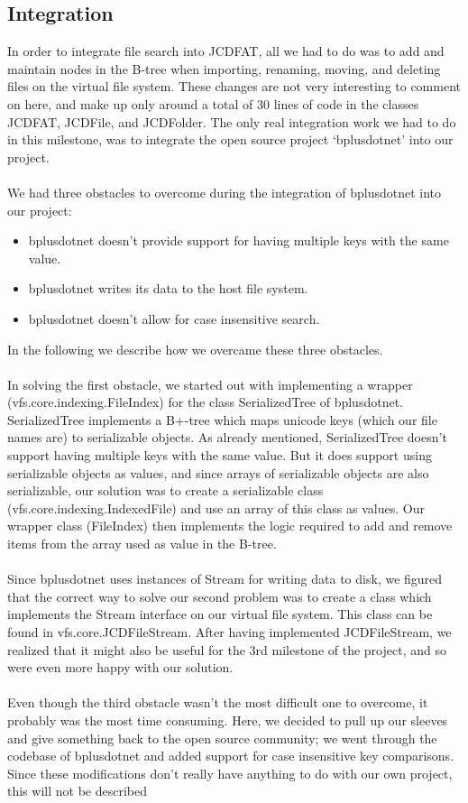 \documentclass[a4paper,12pt]{article}
\begin{document}
\subsection{Integration}
\label{sec:integration}
In order to integrate file search into JCDFAT, all we had to do was to add and maintain nodes in the B-tree when importing, renaming, moving, and deleting files on the virtual file system. These changes are not very interesting to comment on here, and make up only around a total of 30 lines of code in the classes JCDFAT, JCDFile, and JCDFolder. The only real integration work we had to do in this milestone, was to integrate the open source project `bplusdotnet' into our project.\\
\\
We had three obstacles to overcome during the integration of bplusdotnet into our project:
\begin{itemize}
    \item bplusdotnet doesn't provide support for having multiple keys with the same value.
    \item bplusdotnet writes its data to the host file system.
    \item bplusdotnet doesn't allow for case insensitive search.
\end{itemize}
In the following we describe how we overcame these three obstacles.\\
\\
In solving the first obstacle, we started out with implementing a wrapper (vfs.core.indexing.FileIndex) for the class SerializedTree of bplusdotnet. SerializedTree implements a B+-tree which maps unicode keys (which our file names are) to serializable objects. As already mentioned, SerializedTree doesn't support having multiple keys with the same value. But it does support using serializable objects as values, and since arrays of serializable objects are also serializable, our solution was to create a serializable class (vfs.core.indexing.IndexedFile) and use an array of this class as values. Our wrapper class (FileIndex) then implements the logic required to add and remove items from the array used as value in the B-tree.\\
\\
Since bplusdotnet uses instances of Stream for writing data to disk, we figured that the correct way to solve our second problem was to create a class which implements the Stream interface on our virtual file system. This class can be found in vfs.core.JCDFileStream. After having implemented JCDFileStream, we realized that it might also be useful for the 3rd milestone of the project, and so were even more happy with our solution.\\
\\
Even though the third obstacle wasn't the most difficult one to overcome, it probably was the most time consuming. Here, we decided to pull up our sleeves and give something back to the open source community; we went through the codebase of bplusdotnet and added support for case insensitive key comparisons. Since these modifications don't really have anything to do with our own project, this will not be described
\end{document}
